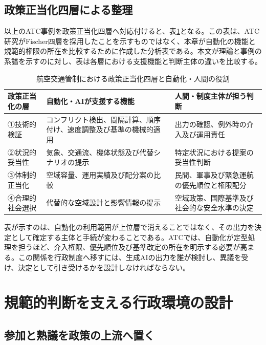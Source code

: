 \subsection{政策正当化四層による整理}

以上のATC事例を政策正当化四層へ対応付けると、表\ref{tab:ch2_atc_fischer}となる。この表は、ATC研究がFischer四層を採用したことを示すものではなく、本章が自動化の機能と規範的権限の所在を比較するために作成した分析表である。本文が理論と事例の系譜を示すのに対し、表は各層における支援機能と判断主体の違いを比較する。

\begin{table}[H]
\centering
\caption{航空交通管制における政策正当化四層と自動化・人間の役割}
\label{tab:ch2_atc_fischer}
\small
\begin{tabular}{p{3cm}p{4cm}p{4cm}}
\toprule
\textbf{政策正当化の層} & \textbf{自動化・AIが支援する機能} & \textbf{人間・制度主体が担う判断} \\
\midrule
①技術的検証 & コンフリクト検出、間隔計算、順序付け、速度調整及び基準の機械的適用 & 出力の確認、例外時の介入及び運用責任 \\
②状況的妥当性 & 気象、交通流、機体状態及び代替シナリオの提示 & 特定状況における提案の妥当性判断 \\
③体制的正当化 & 空域容量、運用実績及び配分案の比較 & 民間、軍事及び緊急運航の優先順位と権限配分 \\
④合理的社会選択 & 代替的な空域設計と影響情報の提示 & 空域政策、国際基準及び社会的な安全水準の決定 \\
\bottomrule
\end{tabular}
\end{table}

表が示すのは、自動化の利用範囲が上位層で消えることではなく、その出力を決定として確定する主体と手続が変わることである。ATCでは、自動化が定型処理を担うほど、介入権限、優先順位及び基準改定の所在を明示する必要が高まる。この関係を行政制度へ移すには、生成AIの出力を誰が検討し、異議を受け、決定として引き受けるかを設計しなければならない。

\section{規範的判断を支える行政環境の設計}

\subsection{参加と熟議を政策の上流へ置く}

